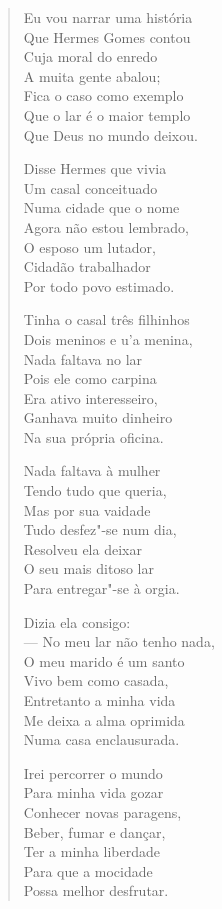 \begin{verse}
Eu vou narrar uma história \\
Que Hermes Gomes contou \\
Cuja moral do enredo \\
A muita gente abalou; \\
Fica o caso como exemplo \\
Que o lar é o maior templo \\
Que Deus no mundo deixou. 

Disse Hermes que vivia \\
Um casal conceituado \\
Numa cidade que o nome \\
Agora não estou lembrado, \\
O esposo um lutador, \\
Cidadão trabalhador \\
Por todo povo estimado. 

Tinha o casal três filhinhos \\
Dois meninos e u'a menina, \\
Nada faltava no lar \\
Pois ele como carpina \\
Era ativo interesseiro, \\
Ganhava muito dinheiro \\
Na sua própria oficina.
\pagebreak

Nada faltava à mulher \\
Tendo tudo que queria, \\
Mas por sua vaidade \\
Tudo desfez"-se num dia, \\
Resolveu ela deixar \\
O seu mais ditoso lar \\
Para entregar"-se à orgia. 

Dizia ela consigo: \\
---  No meu lar não tenho nada, \\
O meu marido é um santo \\
Vivo bem como casada, \\
Entretanto a minha vida \\
Me deixa a alma oprimida \\
Numa casa enclausurada. 

Irei percorrer o mundo \\
Para minha vida gozar \\
Conhecer novas paragens, \\
Beber, fumar e dançar, \\
Ter a minha liberdade \\
Para que a mocidade \\
Possa melhor desfrutar. 


\end{verse}
